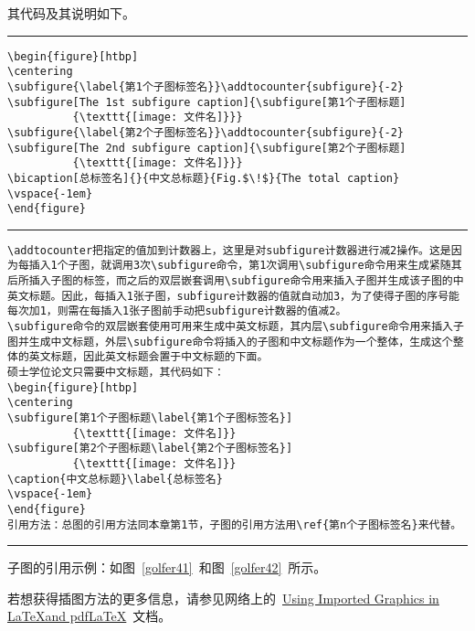 其代码及其说明如下。
\vspace{1em}\noindent\hrule
\begin{lstlisting}
\begin{figure}[htbp]
\centering
\subfigure{\label{第1个子图标签名}}\addtocounter{subfigure}{-2}
\subfigure[The 1st subfigure caption]{\subfigure[第1个子图标题]
          {\texttt{[image: 文件名]}}}
\subfigure{\label{第2个子图标签名}}\addtocounter{subfigure}{-2}
\subfigure[The 2nd subfigure caption]{\subfigure[第2个子图标题]
          {\texttt{[image: 文件名]}}}
\bicaption[总标签名]{}{中文总标题}{Fig.$\!$}{The total caption}
\vspace{-1em}
\end{figure}
\end{lstlisting}
\noindent\hrule
\begin{lstlisting}
\addtocounter把指定的值加到计数器上，这里是对subfigure计数器进行减2操作。这是因为每插入1个子图，就调用3次\subfigure命令，第1次调用\subfigure命令用来生成紧随其后所插入子图的标签，而之后的双层嵌套调用\subfigure命令用来插入子图并生成该子图的中英文标题。因此，每插入1张子图，subfigure计数器的值就自动加3，为了使得子图的序号能每次加1，则需在每插入1张子图前手动把subfigure计数器的值减2。
\subfigure命令的双层嵌套使用可用来生成中英文标题，其内层\subfigure命令用来插入子图并生成中文标题，外层\subfigure命令将插入的子图和中文标题作为一个整体，生成这个整体的英文标题，因此英文标题会置于中文标题的下面。
硕士学位论文只需要中文标题，其代码如下：
\begin{figure}[htbp]
\centering
\subfigure[第1个子图标题\label{第1个子图标签名}]
          {\texttt{[image: 文件名]}}
\subfigure[第2个子图标题\label{第2个子图标签名}]
          {\texttt{[image: 文件名]}}
\caption{中文总标题}\label{总标签名}
\vspace{-1em}
\end{figure}
引用方法：总图的引用方法同本章第1节，子图的引用方法用\ref{第n个子图标签名}来代替。
\end{lstlisting}
\noindent\hrule\vspace{1em}

子图的引用示例：如图~\ref{golfer41}~和图~\ref{golfer42}~所示。

若想获得插图方法的更多信息，请参见网络上的~\href{ftp://ftp.tex.ac.uk/tex-archive/info/epslatex.pdf}{Using Imported Graphics in \LaTeX and pdf\LaTeX}~文档。 
